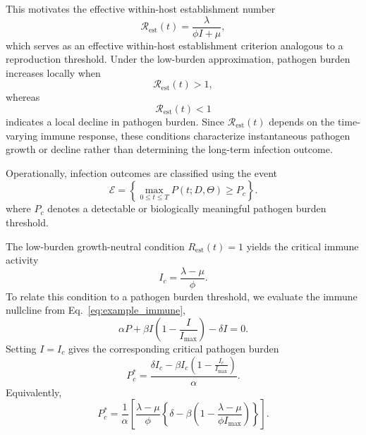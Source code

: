 \documentclass[11pt]{article}
\begin{document}
This motivates the effective within-host establishment number
\begin{equation}
\mathcal{R}_{\mathrm{est}}(t)
=
\frac{\lambda}{\phi I+\mu},
\label{eq:Rest}
\end{equation}
which serves as an effective within-host establishment criterion analogous
to a reproduction threshold. Under the low-burden approximation, pathogen burden
increases locally when
\begin{equation}
\mathcal{R}_{\mathrm{est}}(t)>1,
\end{equation}
whereas
\begin{equation}
\mathcal{R}_{\mathrm{est}}(t)<1
\end{equation}
indicates a local decline in pathogen burden.
Since $\mathcal{R}_{\mathrm{est}}(t)$ depends on the
time-varying immune response, these conditions
characterize instantaneous pathogen growth or
decline rather than determining the long-term
infection outcome.


Operationally, infection outcomes are classified using the event
\begin{equation} 
\mathcal{E} =
\left\{
\max_{0 \le t \le T} P(t;D,\Theta)\ge P_c
\right\}.
\label{eq:infection_threshold_example}
\end{equation}
where $P_c$ denotes a detectable or biologically meaningful pathogen
burden threshold.



The low-burden growth-neutral condition
$R_{\mathrm{est}}(t)=1$ yields the critical
immune activity
\begin{equation}
I_c=\frac{\lambda-\mu}{\phi}.
\end{equation}
To relate this condition to a pathogen burden threshold, we evaluate the
immune nullcline from Eq.~\eqref{eq:example_immune},
\begin{equation}
\alpha P+\beta I\left(1-\frac{I}{I_{\max}}\right)-\delta I=0.
\end{equation}
Setting $I=I_c$ gives the corresponding critical pathogen burden
\begin{equation}
P_c^{\ast}
=
\frac{
\delta I_c
-
\beta I_c\left(1-\frac{I_c}{I_{\max}}\right)
}{\alpha}.
\end{equation}
Equivalently,
\begin{equation}
P_c^{\ast}
=
\frac{1}{\alpha}
\left[
\frac{\lambda-\mu}{\phi}
\left\{
\delta
-
\beta\left(
1-\frac{\lambda-\mu}{\phi I_{\max}}
\right)
\right\}
\right].
\end{equation}
\end{document}
